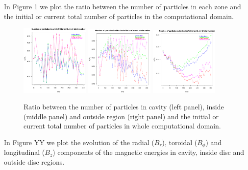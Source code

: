 \documentclass[a4paper,12pt]{article}
\begin{document}
In Figure \ref{number} we plot the ratio between the number of particles in each zone and the initial or current total number of particles in the computational domain.
\begin{figure}[!ht]
 \begin{center}
  \includegraphics[width=0.3\textwidth]{figs/partnumber_vs_t_cavity.eps}
  \includegraphics[width=0.3\textwidth]{figs/partnumber_vs_t_disco.eps}
  \includegraphics[width=0.3\textwidth]{figs/partnumber_vs_t_outside.eps}
  \caption{Ratio between the number of particles in cavity (left panel), inside (middle panel) and outside region (right panel) and the initial or current total number of particles
  in whole computational domain.}
 \label{number}
 \end{center}
\end{figure}


In Figure YY we plot the evolution of the radial ($B_r$), toroidal ($B_{\phi}$) and longitudinal ($B_z$) components of the magnetic energies 
in cavity, inside disc and outside disc regions.
\end{document}
